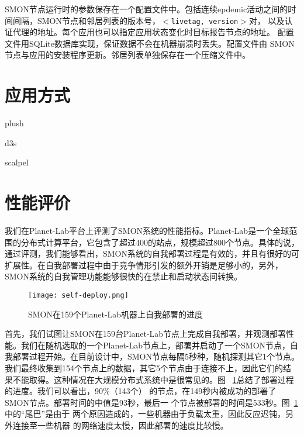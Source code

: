 SMON节点运行时的参数保存在一个配置文件中。包括连续epdemic活动之间的时
间间隔，SMON节点和邻居列表的版本号，$<$\texttt{livetag, version}$>$对，
以及认证代理的地址。每个应用也可以指定应用状态变化时目标报告节点的地址。
配置文件用SQLite数据库实现，保证数据不会在机器崩溃时丢失。配置文件由
SMON节点与应用的安装程序更新。邻居列表单独保存在一个压缩文件中。


\section{应用方式}
\label{sec:smon_app}
plush

d3s

scalpel

\section{性能评价}
\label{sec:smon_eval}

我们在Planet-Lab平台上评测了SMON系统的性能指标。Planet-Lab是一个全球范
围的分布式计算平台，它包含了超过400的站点，规模超过800个节点。具体的说，
通过评测，我们能够看出，SMON系统的自我部署过程是有效的，并且有很好的可
扩展性。在自我部署过程中由于竞争情形引发的额外开销是足够小的，另外，
SMON系统的自我管理功能能够很快的在禁止和启动状态间转换。

\begin{figure}
\centering
  \begin{minipage}{0.8\linewidth}
    \centering
    \texttt{[image: self-deploy.png]}
    \caption{SMON在159个Planet-Lab机器上自我部署的进度}
    \label{fig:self-deploy}
  \end{minipage}
\end{figure}

首先，我们试图让SMON在159台Planet-Lab节点上完成自我部署，并观测部署性
能。我们在随机选取的一个Planet-Lab节点上，部署并启动了一个SMON节点，自
我部署过程开始。在目前设计中，SMON节点每隔5秒种，随机探测其它1个节点。
我们最终收集到154个节点上的数据，其它5个节点由于连接不上，因此它们的结
果不能取得。这种情况在大规模分布式系统中是很常见的。图~
\ref{fig:self-deploy}总结了部署过程的进度。我们可以看出，90\%（143个）
的节点，在149秒内被成功的部署了SMON节点。部署时间的中值是93秒，最后一
个节点被部署的时间是533秒。图~\ref{fig:self-deploy}中的“尾巴”是由于
两个原因造成的，一些机器由于负载太重，因此反应迟钝，另外连接至一些机器
的网络速度太慢，因此部署的速度比较慢。



